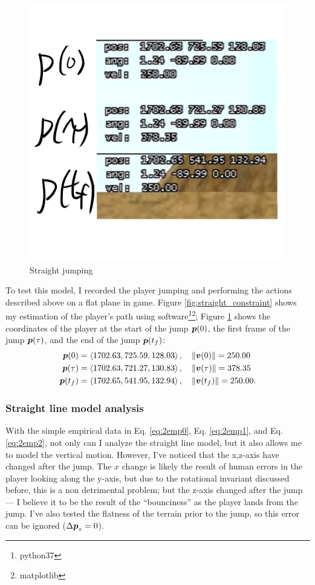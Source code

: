 \begin{figure}[H]
\begin{minipage}{.5\textwidth}
        \includegraphics[width=0.9\linewidth]{assets/2straightjumping.png}
        \caption{Straight jumping}
        \label{fig:2straightjumping}
    \end{minipage}
\end{figure}

To test this model, I recorded the player jumping and performing the actions described above on a flat plane in game. Figure \ref{fig:straight_constraint} shows my estimation of the player's path using software\footnote{python37}\footnote{matplotlib}; Figure \ref{fig:2straightjumping} shows the coordinates of the player at the start of the jump $\boldsymbol{p}(0)$, the first frame of the jump $\boldsymbol{p}(\tau)$, and the end of the jump $\boldsymbol{p}(t_f)$:
\begin{align}
 \boldsymbol{p}(0) &= \left\langle 1702.63, 725.59, 128.03 \right\rangle, \quad \|\boldsymbol{v}(0)\| = 250.00 \label{eq:2emp0}\\
 \boldsymbol{p}(\tau) &= \left\langle 1702.63, 721.27, 130.83 \right\rangle, \quad \|\boldsymbol{v}(\tau)\| = 378.35 \label{eq:2emp1}\\
 \boldsymbol{p}(t_f) &= \left\langle 1702.65,541.95, 132.94 \right\rangle, \quad \|\boldsymbol{v}(t_f)\| = 250.00 \label{eq:2emp2}.
\end{align}

\subsubsection{Straight line model analysis}
With the simple empirical data in Eq. \ref{eq:2emp0}, Eq. \ref{eq:2emp1}, and Eq. \ref{eq:2emp2}, not only can I analyze the straight line model, but it also allows me to model the vertical motion. However, I've noticed that the x,z-axis have changed after the jump. The $x$ change is likely the result of human errors in the player looking along the y-axis, but due to the rotational invariant discussed before, this is a non detrimental problem; but the z-axis changed after the jump --- I believe it to be the result of the ``bounciness'' as the player lands from the jump. I've also tested the flatness of the terrain prior to the jump, so this error can be ignored ($\Delta \boldsymbol{p}_z = 0$).

